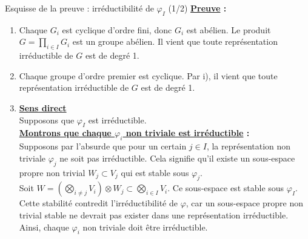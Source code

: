 \documentclass[9pt]{beamer}
\begin{document}
\begin{frame}{Esquisse de la preuve : irréductibilité de \texorpdfstring{$\varphi_I$}{phi\_I} (1/2)}
	\textbf{\underline{Preuve} :}
	\begin{enumerate} [label=\roman*)]
		\item Chaque \( G_i \) est cyclique d'ordre fini, donc \( G_i \) est abélien.  
		Le produit \( G = \prod_{i \in I} G_i \) est un groupe abélien. Il vient que toute représentation irréductible de \( G \) est de degré 1.
		
		\item Chaque groupe d'ordre premier est cyclique. Par i), il vient que toute représentation irréductible de \( G \) est de degré 1.
		
		\item \textbf{\underline{Sens direct}}\\
		Supposons que \( \varphi_I \) est irréductible.\\
		\textbf{\underline{Montrons que chaque \( \varphi_i \) non triviale est irréductible} :}\\
		Supposons par l'absurde que pour un certain \( j \in I \), la représentation non triviale \( \varphi_j \) ne soit pas irréductible. Cela signifie qu'il existe un sous-espace propre non trivial \( W_j \subset V_j \) qui est stable sous \( \varphi_j \).\\
		Soit
		\(
		W = \left( \bigotimes_{i \neq j} V_i \right) \otimes W_j \subset \bigotimes_{i \in I} V_i.
		\)
		Ce sous-espace est stable sous \( \varphi_I \).\\
		Cette stabilité contredit l'irréductibilité de \( \varphi \), car un sous-espace propre non trivial stable ne devrait pas exister dans une représentation irréductible.
		Ainsi, chaque \( \varphi_i \) non triviale doit être irréductible.
	\end{enumerate}
\end{frame}
\end{document}

